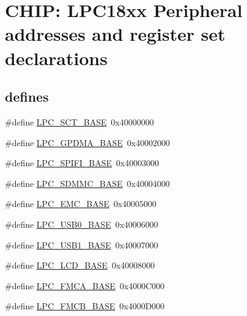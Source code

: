 \hypertarget{group___p_e_r_i_p_h__18_x_x___b_a_s_e}{}\section{C\+H\+IP\+: L\+P\+C18xx Peripheral addresses and register set declarations}
\label{group___p_e_r_i_p_h__18_x_x___b_a_s_e}
\subsection*{\textquotesingle{}defines\textquotesingle{}}
\begin{DoxyCompactItemize}
\item 
\#define \hyperlink{group___p_e_r_i_p_h__18_x_x___b_a_s_e_gad39ca0e94488b4bee5510b2e8bc5a708}{L\+P\+C\+\_\+\+S\+C\+T\+\_\+\+B\+A\+SE}~0x40000000
\item 
\#define \hyperlink{group___p_e_r_i_p_h__18_x_x___b_a_s_e_ga51ba8e3f33730fa2b78be3f892d8c278}{L\+P\+C\+\_\+\+G\+P\+D\+M\+A\+\_\+\+B\+A\+SE}~0x40002000
\item 
\#define \hyperlink{group___p_e_r_i_p_h__18_x_x___b_a_s_e_gad284a5971366e0a8b5fe9881fdb9aa0c}{L\+P\+C\+\_\+\+S\+P\+I\+F\+I\+\_\+\+B\+A\+SE}~0x40003000
\item 
\#define \hyperlink{group___p_e_r_i_p_h__18_x_x___b_a_s_e_ga4175c6e418d0b209c42f789cfa9ff32b}{L\+P\+C\+\_\+\+S\+D\+M\+M\+C\+\_\+\+B\+A\+SE}~0x40004000
\item 
\#define \hyperlink{group___p_e_r_i_p_h__18_x_x___b_a_s_e_ga52f586bf3c6855ad4ef03b1fee3f2f0d}{L\+P\+C\+\_\+\+E\+M\+C\+\_\+\+B\+A\+SE}~0x40005000
\item 
\#define \hyperlink{group___p_e_r_i_p_h__18_x_x___b_a_s_e_ga41d15fd328f821807d202d6c9feb096c}{L\+P\+C\+\_\+\+U\+S\+B0\+\_\+\+B\+A\+SE}~0x40006000
\item 
\#define \hyperlink{group___p_e_r_i_p_h__18_x_x___b_a_s_e_ga72922dbb8f7e3016015922b225773710}{L\+P\+C\+\_\+\+U\+S\+B1\+\_\+\+B\+A\+SE}~0x40007000
\item 
\#define \hyperlink{group___p_e_r_i_p_h__18_x_x___b_a_s_e_gae1746cd618a1eb4f24f95255594f159a}{L\+P\+C\+\_\+\+L\+C\+D\+\_\+\+B\+A\+SE}~0x40008000
\item 
\#define \hyperlink{group___p_e_r_i_p_h__18_x_x___b_a_s_e_gaf59ae457b89f9991f1528a5625234445}{L\+P\+C\+\_\+\+F\+M\+C\+A\+\_\+\+B\+A\+SE}~0x4000\+C000
\item 
\#define \hyperlink{group___p_e_r_i_p_h__18_x_x___b_a_s_e_ga9c9492ce5a1b5e99d6500db256f020c6}{L\+P\+C\+\_\+\+F\+M\+C\+B\+\_\+\+B\+A\+SE}~0x4000\+D000

\end{DoxyCompactItemize}
